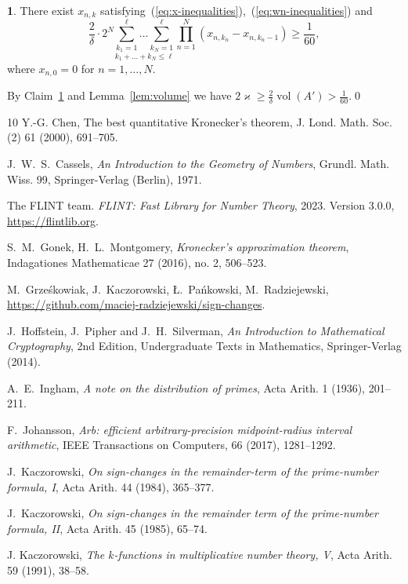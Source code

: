 \documentclass[oneside,english]{amsart}
\numberwithin{equation}{section}
\numberwithin{figure}{section}
\theoremstyle{plain}
\theoremstyle{plain}
\theoremstyle{plain}
\theoremstyle{definition}
\newtheorem{claim}{\protect\claimname}
\providecommand{\claimname}{Claim}
\begin{document}
\begin{claim}
\label{claim:measure}There exist $x_{n,k}$ satisfying~(\ref{eq:x-inequalities}),~(\ref{eq:wn-inequalities})
and
\[
\frac{2}{\delta}\cdot2^{N}\underset{k_{1}+\dotsc+k_{N}\leq\ell}{\sum_{k_{1}=1}^{\ell}\dotsc\sum_{k_{N}=1}^{\ell}}\prod_{n=1}^{N}\left(x_{n,k_{n}}-x_{n,k_{n}-1}\right)\geq\frac{1}{60},
\]
where $x_{n,0}=0$ for $n=1,\dotsc,N$.
\end{claim}
By Claim~\ref{claim:measure} and Lemma~\ref{lem:volume} we have
$2\varkappa\geq\frac{2}{\delta}\operatorname{vol}(A')>\frac{1}{60}$.\qed 
\begin{thebibliography}{10}
Y.-G. Chen, The best quantitative Kronecker’s theorem,
J. Lond. Math. Soc. (2) 61 (2000), 691--705.

J.~W.~S.~Cassels, \emph{An Introduction to
the Geometry of Numbers}, Grundl. Math. Wiss. 99, Springer-Verlag
(Berlin), 1971.

The FLINT team. \emph{FLINT: Fast Library for Number
Theory}, 2023. Version 3.0.0, \url{https://flintlib.org}.

S.~M.~Gonek, H.~L.~Montgomery, \emph{Kronecker's
approximation theorem}, Indagationes Mathematicae 27 (2016), no. 2,
506--523.

M.~Grześkowiak, J.~Kaczorowski, Ł.~Pańkowski, M.~Radziejewski,
\url{https://github.com/maciej-radziejewski/sign-changes}.

J.~Hoffstein, J.~Pipher and
J.~H.~Silverman, \emph{An Introduction to Mathematical Cryptography},
2nd Edition, Undergraduate Texts in Mathematics, Springer-Verlag (2014).

A.~E.~Ingham, \emph{A note on the distribution
of primes}, Acta Arith. 1 (1936), 201--211. 

F.~Johansson, \emph{Arb: efficient arbitrary-precision
midpoint-radius interval arithmetic}, IEEE Transactions on Computers,
66 (2017), 1281--1292.

J.~Kaczorowski, \emph{On sign-changes in
the remainder-term of the prime-number formula, I}, Acta Arith. 44
(1984), 365--377.

J.~Kaczorowski, \emph{On sign-changes in
the remainder term of the prime-number formula, II}, Acta Arith. 45
(1985), 65--74.

J. Kaczorowski, \emph{The $k$-functions
in multiplicative number theory, V}, Acta Arith. 59 (1991), 38--58.


\end{thebibliography}
\end{document}

